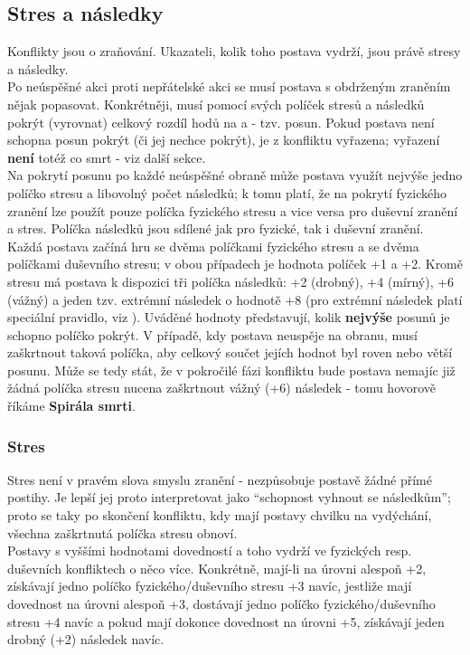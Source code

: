 \documentclass[../main.tex]{subfiles}
\begin{document}
\subsection{Stres a následky}
\label{sec:stres-nasledky}

Konflikty jsou o zraňování. Ukazateli, kolik toho postava vydrží, jsou právě stresy a následky.\\
Po neúspěšné akci  proti nepřátelské akci  se musí postava s obdrženým zraněním nějak popasovat. Konkrétněji, musí pomocí svých políček stresů a následků pokrýt (vyrovnat) celkový rozdíl hodů na  a  - tzv. posun. Pokud postava není schopna posun pokrýt (či jej nechce pokrýt), je z konfliktu vyřazena; vyřazení \textbf{není} totéž co smrt - viz další sekce.\\
Na pokrytí posunu po každé neúspěšné obraně může postava využít nejvýše jedno políčko stresu a libovolný počet následků; k tomu platí, že na pokrytí fyzického zranění lze použít pouze políčka fyzického stresu a vice versa pro duševní zranění a stres. Políčka následků jsou sdílené jak pro fyzické, tak i duševní zranění.\\
Každá postava začíná hru se dvěma políčkami fyzického stresu a se dvěma políčkami duševního stresu; v obou případech je hodnota políček +1 a +2. Kromě stresu má postava k dispozici tři políčka následků: +2 (drobný), +4 (mírný), +6 (vážný) a jeden tzv. extrémní následek o hodnotě +8 (pro extrémní následek platí speciální pravidlo, viz ). Uváděné hodnoty představují, kolik \textbf{nejvýše} posunů je schopno políčko pokrýt. V případě, kdy postava neuspěje na obranu, musí zaškrtnout taková políčka, aby celkový součet jejích hodnot byl roven nebo větší posunu. Může se tedy stát, že v pokročilé fázi konfliktu bude postava nemajíc již žádná políčka stresu nucena zaškrtnout vážný (+6) následek - tomu hovorově říkáme \textbf{Spirála smrti}.\\

\subsubsection{Stres}
\label{sec:stres}

Stres není v pravém slova smyslu zranění - nezpůsobuje postavě žádné přímé postihy. Je lepší jej proto interpretovat jako ``schopnost vyhnout se následkům''; proto se taky po skončení konfliktu, kdy mají postavy chvilku na vydýchání, všechna zaškrtnutá políčka stresu obnoví.\\
Postavy s vyššími hodnotami dovedností  a  toho vydrží ve fyzických resp. duševních konfliktech o něco více. Konkrétně, mají-li  na úrovni alespoň +2, získávají jedno políčko fyzického/duševního stresu +3 navíc, jestliže mají dovednost na úrovni alespoň +3, dostávají jedno políčko fyzického/duševního stresu +4 navíc a pokud mají dokonce dovednost na úrovni +5, získávají jeden drobný (+2) následek navíc.
\end{document}

